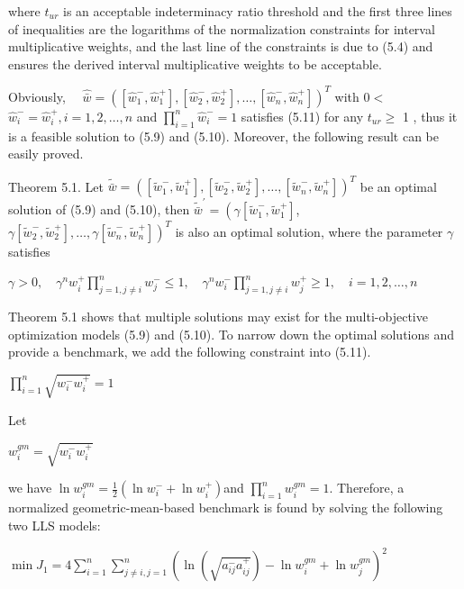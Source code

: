 \documentclass[10pt]{article}
\begin{document}
where $t_{u r}$ is an acceptable indeterminacy ratio threshold and the first three lines of inequalities are the logarithms of the normalization
constraints for interval multiplicative weights, and the last line of the constraints is due to (5.4) and ensures the derived interval multiplicative weights to be acceptable.

Obviously, $\quad \hat{\bar{w}}=\left(\left[\hat{w}_{1}^{-}, \hat{w}_{1}^{+}\right],\left[\hat{w}_{2}^{-}, \hat{w}_{2}^{+}\right], \ldots,\left[\hat{w}_{n}^{-}, \hat{w}_{n}^{+}\right]\right)^{T}$ with $0<$ $\hat{w}_{i}^{-}=\hat{w}_{i}^{+}, i=1,2, \ldots, n$ and $\prod_{i=1}^{n} \hat{w}_{i}^{-}=1$ satisfies (5.11) for any $t_{u r} \geq$ 1 , thus it is a feasible solution to (5.9) and (5.10). Moreover, the following result can be easily proved.

Theorem 5.1. Let $\tilde{\bar{w}}=\left(\left[\tilde{w}_{1}^{-}, \tilde{w}_{1}^{+}\right],\left[\tilde{w}_{2}^{-}, \tilde{w}_{2}^{+}\right], \ldots,\left[\tilde{w}_{n}^{-}, \tilde{w}_{n}^{+}\right]\right)^{T}$ be an optimal solution of (5.9) and (5.10), then $\tilde{\bar{w}}^{\prime}=\left(\gamma\left[\tilde{w}_{1}^{-}, \tilde{w}_{1}^{+}\right]\right.$, $\left.\gamma\left[\tilde{w}_{2}^{-}, \tilde{w}_{2}^{+}\right], \ldots, \gamma\left[\tilde{w}_{n}^{-}, \tilde{w}_{n}^{+}\right]\right)^{T}$ is also an optimal solution, where the parameter $\gamma$ satisfies

$\gamma>0, \quad \gamma^{n} w_{i}^{+} \prod_{j=1, j \neq i}^{n} w_{j}^{-} \leq 1, \quad \gamma^{n} w_{i}^{-} \prod_{j=1, j \neq i}^{n} w_{j}^{+} \geq 1, \quad i=1,2, \ldots, n$

Theorem 5.1 shows that multiple solutions may exist for the multi-objective optimization models (5.9) and (5.10). To narrow down the optimal solutions and provide a benchmark, we add the following constraint into (5.11).

$\prod_{i=1}^{n} \sqrt{w_{i}^{-} w_{i}^{+}}=1$

Let

$w_{i}^{g m}=\sqrt{w_{i}^{-} w_{i}^{+}}$

we have $\ln w_{i}^{g m}=\frac{1}{2}\left(\ln w_{i}^{-}+\ln w_{i}^{+}\right)$and $\prod_{i=1}^{n} w_{i}^{g m}=1$. Therefore, a normalized geometric-mean-based benchmark is found by solving the following two LLS models:

$\min J_{1}=4 \sum_{i=1}^{n} \sum_{j \neq i, j=1}^{n}\left(\ln \left(\sqrt{a_{i j}^{-} a_{i j}^{+}}\right)-\ln w_{i}^{g m}+\ln w_{j}^{g m}\right)^{2}$
\end{document}
